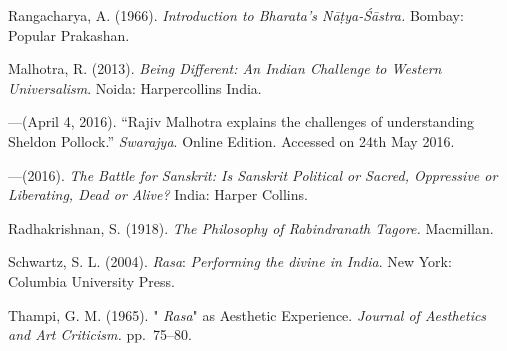 \begin{thebibliography}{99}
Rangacharya, A. (1966). \textsl{Introduction to Bharata's Nāṭya-Śāstra.} Bombay: Popular Prakashan.

Malhotra, R. (2013). \textsl{Being Different: An Indian Challenge to Western Universalism}. Noida: Harpercollins India.

---\kern3pt(April 4, 2016). “Rajiv Malhotra explains the challenges of understanding Sheldon Pollock.” \textsl{Swarajya}. Online Edition. Accessed on 24th May 2016.

---\kern3pt(2016). \textsl{The Battle for Sanskrit: Is Sanskrit Political or Sacred, Oppressive or Liberating, Dead or Alive?} India: Harper Collins.

Radhakrishnan, S. (1918). \textsl{The Philosophy of Rabindranath Tagore.} Macmillan. 

Schwartz, S. L. (2004). \textsl{Rasa}: \textsl{Performing the divine in India}. New York: Columbia University Press. 

Thampi, G. M. (1965). " \textsl{Rasa}" as Aesthetic Experience. \textsl{Journal of Aesthetics and Art Criticism.} pp.~75--80.
\end{thebibliography}

\theendnotes 
